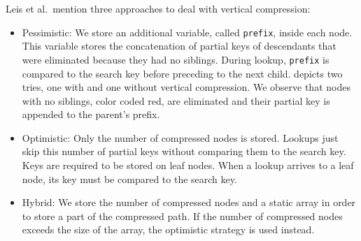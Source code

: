 \documentclass[abstracton,12pt]{scrartcl}
\theoremstyle{definition}
\begin{document}
Leis et al.\ mention three approaches to deal with vertical compression:
\begin{itemize}
  \item Pessimistic: We store an additional variable, called \texttt{prefix},
    inside each node. This variable stores the concatenation of partial keys
    of descendants that were eliminated because they had no siblings. During
    lookup, \texttt{prefix} is compared to the search key before preceding to
    the next child.  depicts two tries, one 
    with and one without vertical compression. We observe that nodes with no 
    siblings, color coded red, are eliminated and their partial key is 
    appended to the parent's prefix.

  \item Optimistic: Only the number of compressed nodes is stored. Lookups
    just skip this number of partial keys without comparing them to the search
    key. Keys are required to be stored on leaf nodes. When a lookup arrives
    to a leaf node, its key must be compared to the search key. 

  \item Hybrid: We store the number of compressed nodes and a static array
    in order to store a part of the compressed path. If the number of
    compressed nodes exceeds the size of the array, the optimistic strategy is
    used instead.
\end{itemize}
\end{document}
